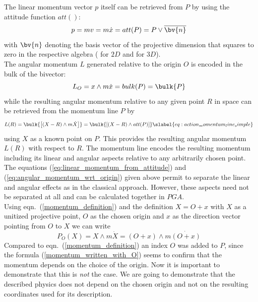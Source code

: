 The linear momentum vector $p$ itself can be retrieved from $P$ by using the attitude
function $att()$:
\begin{equation}
    p = m v = m \dot{x} = att(P) = P \vee \overline{\bv{n}}
    \label{eq:linear_momentum_from_attitude}
\end{equation}
with $\bv{n}$ denoting the basis vector of the projective dimension that squares to zero
in the respective algebra ( for $2D$ and  for $3D$). \\

The angular momentum $L$ generated relative to the origin $O$ is encoded in the bulk of
the bivector:
\begin{equation}
    L_{O} = x \wedge m \dot{x} = bulk(P) = \bulk{P}
    \label{eq:angular_momentum_wrt_origin}
\end{equation}
while the resulting angular momentum relative to any given point $R$ in space can be
retrieved from the momentum line $P$ by
\begin{equation}
    L(R) = \bulk{\left[ (X-R) \wedge m\dot{X} \right]}
         = \bulk{\left[ (X-R) \wedge att(P) \right]}
           \slabel{eq:action_momentum_line_simple}
\end{equation}
using $X$ as a known point on $P$. This provides the resulting angular momentum $L(R)$
with respect to $R$. The momentum line encodes the resulting momentum including its linear
and angular aspects relative to any arbitrarily chosen point. \\

The equations (\ref{eq:linear_momentum_from_attitude}) and
(\ref{eq:angular_momentum_wrt_origin}) given above permit to separate the linear and
angular effects as in the classical approach. However, these aspects need not be separated
at all and can be calculated together in $PGA$.\\

Using eqn.~(\ref{momentum_definition}) and the definition $X=O + x$ with $X$ as a unitized
projective point, $O$ as the chosen origin and $x$ as the direction vector pointing from
$O$ to $X$ we can write
\begin{equation}
    P_O(X) = X \wedge m \dot{X} = (O + x) \wedge m \dot{(O + x)}
    \label{momentum_written_with_O}
\end{equation}
Compared to eqn.~(\ref{momentum_definition}) an index $O$ was added to $P$, since the
formula (\ref{momentum_written_with_O}) seems to confirm that the momentum depends on the
choice of the origin. Now it is important to demonstrate  that this is \emph{not} the
case. We are going to demonstrate that the described physics does not depend on the chosen
origin and not on the resulting coordinates used for its description. \\

